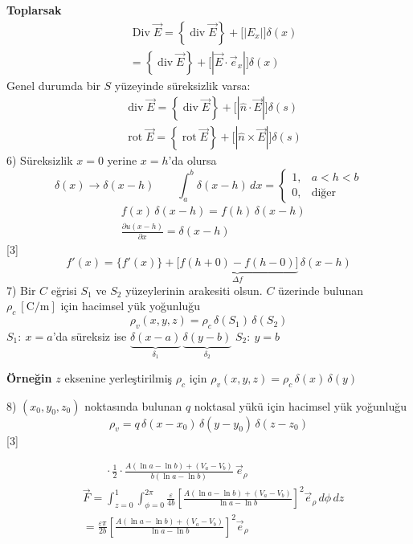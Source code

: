 \documentclass[11pt,a4paper]{article}
\begin{document}
\textbf{Toplarsak}
\begin{align*}
&\operatorname{Div}\vec E=\left\{\operatorname{div}\vec E\right\}+\bigl[|E_x|\bigr]\delta(x)\\
&=\left\{\operatorname{div}\vec E\right\}+\bigl[|\vec E\cdot\vec e_x|\bigr]\delta(x)
\end{align*}
Genel durumda bir $S$ yüzeyinde süreksizlik varsa:
\begin{align*}
&\operatorname{div}\vec E=\left\{\operatorname{div}\vec E\right\}+\bigl[|\hat n\cdot\vec E|\bigr]\delta(s)\\
&\operatorname{rot}\vec E=\left\{\operatorname{rot}\vec E\right\}+\bigl[|\hat n\times\vec E|\bigr]\delta(s)
\end{align*}
6) Süreksizlik $x=0$ yerine $x=h$'da olursa
\[ \delta(x)\to\delta(x-h)\qquad \int_a^b\delta(x-h)\,dx=\begin{cases}1, & a<h<b\\ 0, & \text{diğer}\end{cases} \]
\begin{align*}
&f(x)\,\delta(x-h)=f(h)\,\delta(x-h)\\
&\frac{\partial u(x-h)}{\partial x}=\delta(x-h)
\end{align*}
[3]
\[ f'(x)=\{f'(x)\}+\underbrace{\bigl[f(h+0)-f(h-0)\bigr]}_{\Delta f}\,\delta(x-h) \]
7) Bir $C$ eğrisi $S_1$ ve $S_2$ yüzeylerinin arakesiti olsun. $C$ üzerinde bulunan $\rho_c\ [\mathrm{C/m}]$ için hacimsel yük yoğunluğu
\[ \rho_v(x,y,z)=\rho_c\,\delta(S_1)\,\delta(S_2) \]
$S_1:\ x=a$'da süreksiz ise $\underbrace{\delta(x-a)}_{\delta_1}\,\underbrace{\delta(y-b)}_{\delta_2}$ \qquad $S_2:\ y=b$

\textbf{Örneğin} $z$ eksenine yerleştirilmiş $\rho_c$ için $\rho_v(x,y,z)=\rho_c\,\delta(x)\,\delta(y)$

8) $(x_0,y_0,z_0)$ noktasında bulunan $q$ noktasal yükü için hacimsel yük yoğunluğu
\[ \rho_v=q\,\delta(x-x_0)\,\delta(y-y_0)\,\delta(z-z_0) \]
[3]

\begin{align*}
&\qquad\cdot\frac12\cdot\frac{A(\ln a-\ln b)+(V_a-V_b)}{b(\ln a-\ln b)}\,\vec e_\rho\\
&\vec F=\int_{z=0}^{1}\int_{\phi=0}^{2\pi}\frac{\varepsilon}{4b}\left[\frac{A(\ln a-\ln b)+(V_a-V_b)}{\ln a-\ln b}\right]^2\vec e_\rho\,d\phi\,dz\\
&=\frac{\varepsilon\pi}{2b}\left[\frac{A(\ln a-\ln b)+(V_a-V_b)}{\ln a-\ln b}\right]^2\vec e_\rho
\end{align*}
\end{document}
